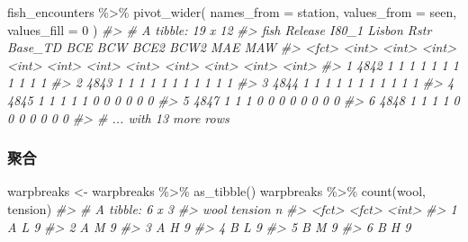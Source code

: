 \documentclass[
]{book}
\newenvironment{Shaded}{\begin{snugshade}}{\end{snugshade}}
\newcommand{\AttributeTok}[1]{\textcolor[rgb]{0.77,0.63,0.00}{#1}}
\newcommand{\CommentTok}[1]{\textcolor[rgb]{0.56,0.35,0.01}{\textit{#1}}}
\newcommand{\DecValTok}[1]{\textcolor[rgb]{0.00,0.00,0.81}{#1}}
\newcommand{\FunctionTok}[1]{\textcolor[rgb]{0.00,0.00,0.00}{#1}}
\newcommand{\NormalTok}[1]{#1}
\newcommand{\OtherTok}[1]{\textcolor[rgb]{0.56,0.35,0.01}{#1}}
\newcommand{\SpecialCharTok}[1]{\textcolor[rgb]{0.00,0.00,0.00}{#1}}
\begin{document}
\begin{Shaded}
\begin{Highlighting}[]
\NormalTok{fish\_encounters }\SpecialCharTok{\%\textgreater{}\%} \FunctionTok{pivot\_wider}\NormalTok{(}
  \AttributeTok{names\_from =}\NormalTok{ station, }
  \AttributeTok{values\_from =}\NormalTok{ seen,}
  \AttributeTok{values\_fill =} \DecValTok{0}
\NormalTok{)}
\CommentTok{\#\textgreater{} \# A tibble: 19 x 12}
\CommentTok{\#\textgreater{}   fish  Release I80\_1 Lisbon  Rstr Base\_TD   BCE   BCW  BCE2  BCW2   MAE   MAW}
\CommentTok{\#\textgreater{}   \textless{}fct\textgreater{}   \textless{}int\textgreater{} \textless{}int\textgreater{}  \textless{}int\textgreater{} \textless{}int\textgreater{}   \textless{}int\textgreater{} \textless{}int\textgreater{} \textless{}int\textgreater{} \textless{}int\textgreater{} \textless{}int\textgreater{} \textless{}int\textgreater{} \textless{}int\textgreater{}}
\CommentTok{\#\textgreater{} 1 4842        1     1      1     1       1     1     1     1     1     1     1}
\CommentTok{\#\textgreater{} 2 4843        1     1      1     1       1     1     1     1     1     1     1}
\CommentTok{\#\textgreater{} 3 4844        1     1      1     1       1     1     1     1     1     1     1}
\CommentTok{\#\textgreater{} 4 4845        1     1      1     1       1     0     0     0     0     0     0}
\CommentTok{\#\textgreater{} 5 4847        1     1      1     0       0     0     0     0     0     0     0}
\CommentTok{\#\textgreater{} 6 4848        1     1      1     1       0     0     0     0     0     0     0}
\CommentTok{\#\textgreater{} \# ... with 13 more rows}
\end{Highlighting}
\end{Shaded}

\hypertarget{ux805aux5408}{%
\subsubsection{聚合}\label{ux805aux5408}}

\begin{Shaded}
\begin{Highlighting}[]
\NormalTok{warpbreaks }\OtherTok{\textless{}{-}}\NormalTok{ warpbreaks }\SpecialCharTok{\%\textgreater{}\%} \FunctionTok{as\_tibble}\NormalTok{() }
\NormalTok{warpbreaks }\SpecialCharTok{\%\textgreater{}\%} \FunctionTok{count}\NormalTok{(wool, tension)}
\CommentTok{\#\textgreater{} \# A tibble: 6 x 3}
\CommentTok{\#\textgreater{}   wool  tension     n}
\CommentTok{\#\textgreater{}   \textless{}fct\textgreater{} \textless{}fct\textgreater{}   \textless{}int\textgreater{}}
\CommentTok{\#\textgreater{} 1 A     L           9}
\CommentTok{\#\textgreater{} 2 A     M           9}
\CommentTok{\#\textgreater{} 3 A     H           9}
\CommentTok{\#\textgreater{} 4 B     L           9}
\CommentTok{\#\textgreater{} 5 B     M           9}
\CommentTok{\#\textgreater{} 6 B     H           9}
\end{Highlighting}
\end{Shaded}
\end{document}
